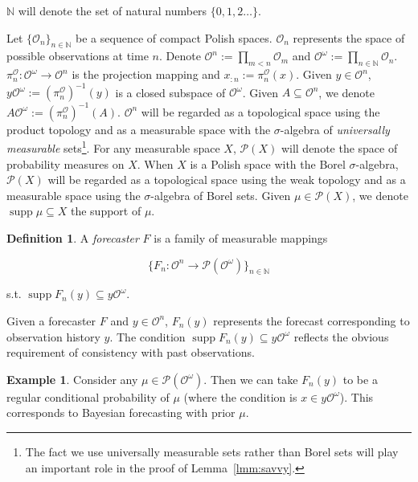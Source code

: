 \documentclass[11pt]{article}
\theoremstyle{definition}
\newtheorem{definition}{Definition}%
\newtheorem{example}{Example}%
\theoremstyle{plain}
\newcommand{\Nats}{\mathbb{N}}
\newcommand{\Sq}[2]{\{#1\}_{#2 \in \Nats}}
\newcommand{\Sqn}[1]{\Sq{#1}{n}}
\newcommand{\PM}{\mathcal{P}}
\DeclareMathOperator{\Sp}{supp}
\newcommand{\Ob}{\mathcal{O}}
\newcommand{\OO}{\Ob^\omega}
\newcommand{\PO}{\pi^\Ob}
\newcommand{\PMO}{\PM(\OO)}
\begin{document}
$\Nats$ will denote the set of natural numbers $\{0, 1, 2 \ldots\}$.

Let $\Sqn{\Ob_n}$ be a sequence of compact Polish spaces. $\Ob_n$ represents the space of possible observations at time $n$. Denote $\Ob^n := \prod_{m < n} \Ob_m$  and $\Ob^\omega:=\prod_{n \in \Nats} \Ob_n$. $\PO_n: \Ob^\omega \rightarrow \Ob^n$ is the projection mapping and $x_{:n}:=\PO_n\left(x\right)$. Given $y \in \Ob^n$, $y\OO := \left(\PO_n\right)^{-1}\left(y\right)$ is a closed subspace of $\OO$. Given $A\subseteq\Ob^n$, we denote $A\Ob^\omega:=\left(\PO_n\right)^{-1}(A)$. $\Ob^n$ will be regarded as a topological space using the product topology and as a measurable space with the $\sigma$-algebra of \emph{universally measurable} sets\footnote{The fact we use universally measurable sets rather than Borel sets will play an important role in the proof of Lemma~\ref{lmm:savvy}.}. For any measurable space $X$, $\PM\left(X\right)$ will denote the space of probability measures on $X$. When $X$ is a Polish space with the Borel $\sigma$-algebra, $\PM\left(X\right)$ will be regarded as a topological space using the weak topology and as a measurable space using the $\sigma$-algebra of Borel sets. Given $\mu \in \PM\left(X\right)$, we denote $\Sp \mu \subseteq X$ the support of $\mu$.

\begin{samepage}
\begin{definition}

A \emph{forecaster} $F$ is a family of measurable mappings

\[\Sqn{F_n: \Ob^n \rightarrow \PMO}\]

s.t. $\Sp {F_n\left(y\right)} \subseteq y\OO$.

\end{definition}
\end{samepage}

Given a forecaster $F$ and $y \in \Ob^n$, $F_n\left(y\right)$ represents the forecast corresponding to observation history $y$. The condition $\Sp {F_n\left(y\right)} \subseteq y\OO$ reflects the obvious requirement of consistency with past observations.

\begin{samepage}
\begin{example}

Consider any $\mu\in\PMO$. Then we can take $F_n(y)$ to be a regular conditional probability of $\mu$ (where the condition is $x \in y\OO$). This corresponds to Bayesian forecasting with prior $\mu$.

\end{example}
\end{samepage}
\end{document}

